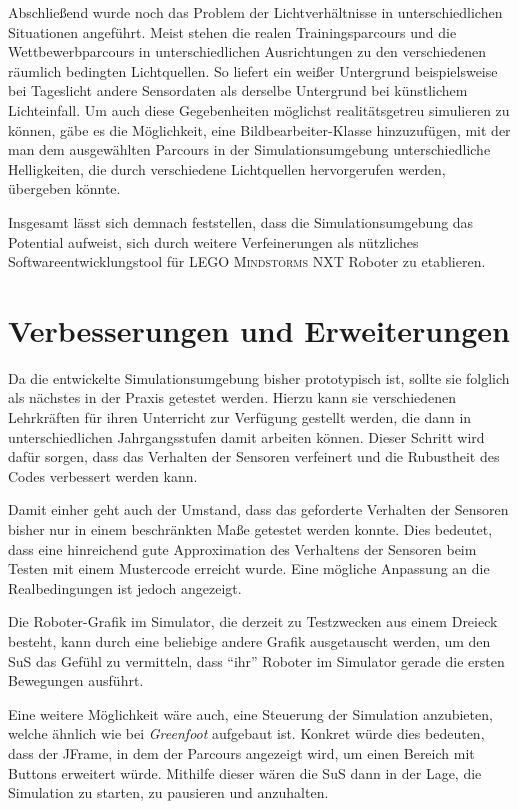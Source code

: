 \documentclass[paper=a4, DIV=calc, BCOR=12mm, twoside=on, onecolumn=on, open = right, titlepage =on, parskip =half-, headsepline = on, footsepline = off, chapterprefix = off, appendixprefix = on, fontsize = 12pt, numbers = noenddot, abstract = on]{scrbook}
\begin{document}
Abschließend wurde noch das Problem der Lichtverhältnisse in unterschiedlichen Situationen angeführt. Meist stehen die realen Trainingsparcours und die Wettbewerbparcours in unterschiedlichen Ausrichtungen zu den verschiedenen räumlich bedingten Lichtquellen. So liefert ein weißer Untergrund beispielsweise bei Tageslicht andere Sensordaten als derselbe Untergrund bei künstlichem Lichteinfall. Um auch diese Gegebenheiten möglichst realitätsgetreu simulieren zu können, gäbe es die Möglichkeit, eine Bildbearbeiter-Klasse hinzuzufügen, mit der man dem ausgewählten Parcours in der Simulationsumgebung unterschiedliche Helligkeiten, die durch verschiedene Lichtquellen hervorgerufen werden, übergeben könnte.

Insgesamt lässt sich demnach feststellen, dass die Simulationsumgebung das Potential aufweist, sich durch weitere Verfeinerungen als nützliches Softwareentwicklungstool für \textsc{LEGO Mindstorms} NXT Roboter zu etablieren.


\section{Verbesserungen und Erweiterungen}

Da die entwickelte Simulationsumgebung bisher prototypisch ist, sollte sie folglich als nächstes in der Praxis getestet werden. Hierzu kann sie verschiedenen Lehrkräften für ihren Unterricht zur Verfügung gestellt werden, die dann in unterschiedlichen Jahrgangsstufen damit arbeiten können. Dieser Schritt wird dafür sorgen, dass das Verhalten der Sensoren verfeinert und die Rubustheit des Codes verbessert werden kann.

Damit einher geht auch der Umstand, dass das geforderte Verhalten der Sensoren bisher nur in einem beschränkten Maße getestet werden konnte. Dies bedeutet,
dass eine hinreichend gute Approximation des Verhaltens der Sensoren beim
Testen mit einem Mustercode erreicht wurde. Eine mögliche Anpassung an die Realbedingungen ist jedoch angezeigt.

Die Roboter-Grafik im Simulator, die derzeit zu Testzwecken aus einem Dreieck besteht, kann durch eine beliebige andere Grafik ausgetauscht werden, um den SuS das Gefühl zu vermitteln, dass "`ihr"' Roboter im Simulator gerade die ersten Bewegungen ausführt.

Eine weitere Möglichkeit wäre auch, eine Steuerung der Simulation anzubieten, welche ähnlich wie bei \emph{Greenfoot} aufgebaut ist. Konkret würde dies bedeuten, dass der JFrame, in dem der Parcours angezeigt wird, um einen Bereich mit Buttons erweitert würde. Mithilfe dieser wären die SuS dann in der Lage, die Simulation zu starten, zu pausieren und anzuhalten.
\end{document}
